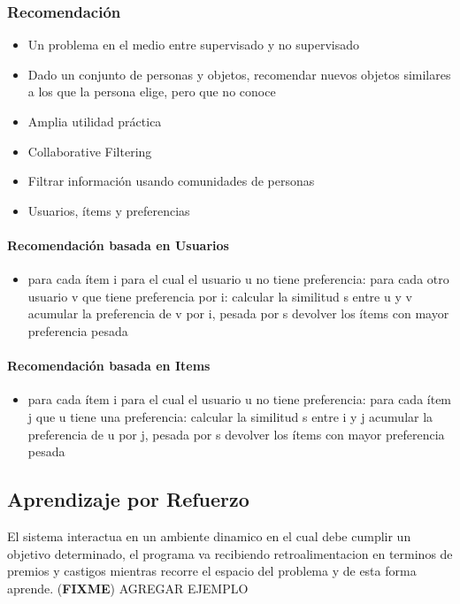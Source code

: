 \documentclass[a4paper,11pt,spanish]{book}
\newcommand*{\FIXME}[1]{{(\textbf{FIXME}) {#1}}}
\begin{document}
      \subsubsection {Recomendación}
	\begin{itemize}
	  \item Un problema en el medio entre supervisado y no supervisado
	  \item Dado un conjunto de personas y objetos, recomendar nuevos objetos similares a los que la persona elige, pero que no conoce
	  \item Amplia utilidad práctica
	  \item Collaborative Filtering
	  \item Filtrar información usando comunidades de personas
	  \item Usuarios, ítems y preferencias
	\end{itemize}
      \paragraph {Recomendación basada en Usuarios}
	\begin{itemize}
	  \item para cada ítem i para el cual el usuario u no tiene preferencia:
	    \subitem para cada otro usuario v que tiene preferencia por i:
	      \subsubitem calcular la similitud s entre u y v
	      \subsubitem acumular la preferencia de v por i, pesada por s
	      \subsubitem devolver los ítems con mayor preferencia pesada
	\end{itemize}
      \paragraph {Recomendación basada en Items}
	\begin{itemize}
	  \item para cada ítem i para el cual el usuario u no tiene preferencia:
	    \subitem para cada ítem j que u tiene una preferencia:
	      \subsubitem calcular la similitud s entre i y j
	      \subsubitem acumular la preferencia de u por j, pesada por s
	      \subsubitem devolver los ítems con mayor preferencia pesada
	\end{itemize}
    
    \subsection{Aprendizaje por Refuerzo}
      El sistema interactua en un ambiente dinamico en el cual debe cumplir un objetivo determinado, el programa va recibiendo retroalimentacion en terminos de premios y castigos mientras 
      recorre el espacio del problema y de esta forma aprende.
      \FIXME{AGREGAR EJEMPLO}
\end{document}
